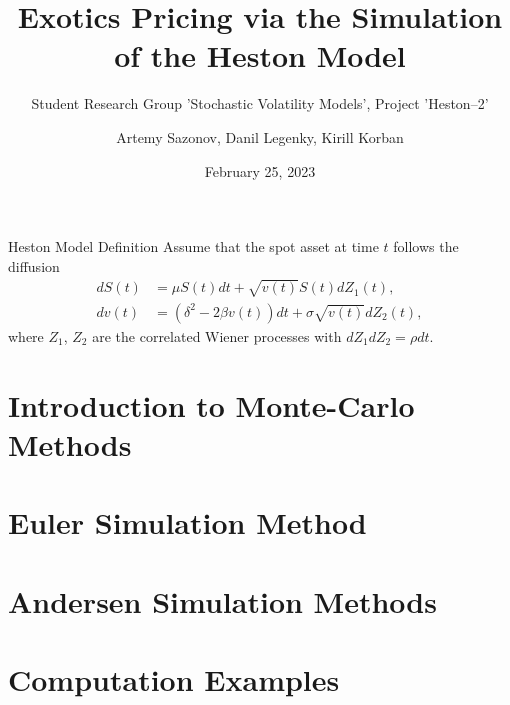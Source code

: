 \documentclass[aspectratio=169]{beamer}
\subtitle{Student Research Group 'Stochastic Volatility Models', Project 'Heston--2'}
\title{Exotics Pricing via the Simulation of the Heston Model}
\author{Artemy Sazonov, Danil Legenky, Kirill Korban}
\institute{Lomonosov Moscow State Univesity, Faculty of Mechanics and Mathematics}
\date{February 25, 2023}
\begin{document}
    \maketitle

    \begin{frame}{Heston Model Definition}
        Assume that the spot asset at time $t$ follows the diffusion
        \begin{align}
            dS(t) & = \mu S(t)dt + \sqrt{v(t)} S(t) dZ_1(t), \label{Heston:price}\\
            dv(t) & = \left(\delta^2 - 2\beta v(t)\right) dt + \sigma\sqrt{v(t)} dZ_2(t), \label{Heston:variance}
        \end{align}
        where $Z_1$, $Z_2$ are the correlated Wiener processes with $dZ_1dZ_2 = \rho dt$.
    \end{frame}

    \section{Introduction to Monte-Carlo Methods}
        

    \section{Euler Simulation Method}
        

    \section{Andersen Simulation Methods}
        

    \section{Computation Examples}
        

    
\end{document}
